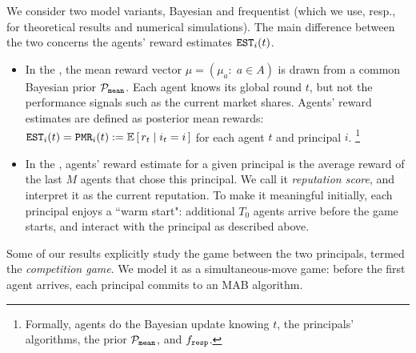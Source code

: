 

We consider two model variants, Bayesian and frequentist (which we use, resp., for theoretical results and numerical simulations). The main difference between the two concerns the agents' reward estimates $\mathtt{EST}_i(t)$.

\begin{itemize}
\item In the \emph{\TheoryModel}, the mean reward vector $\mu = (\mu_a:\; a\in A)$ is drawn from a common Bayesian prior $\mathcal{P}_\mathtt{mean}$. Each agent knows its global round $t$, but not the performance signals such as the current market shares. Agents' reward estimates are defined as posterior mean rewards:
        $\est_i(t) = \PMR_i(t) := \E\sbr{ r_t\mid i_t = i}$
    for each agent $t$ and principal $i$.%
\footnote{Formally, agents do the Bayesian update knowing $t$, the principals' algorithms, the prior $\mathcal{P}_\mathtt{mean}$, and $f_{\mathtt{resp}}$.}


\item In the \emph{\ExptsModel}, agents' reward estimate for a given principal is the average reward of the last $M$ agents that chose this principal. We call it \emph{reputation score}, and interpret it as the current reputation. To make it meaningful initially, each principal enjoys a ``warm start": additional $T_0$ agents arrive before the game starts, and interact with the principal as described above.

\end{itemize}

Some of our results explicitly study the game between the two principals, termed the \emph{competition game}. We model it as a simultaneous-move game: before the first agent arrives, each principal commits to an MAB algorithm. 


